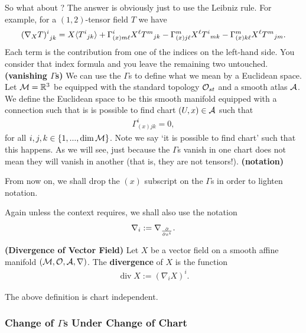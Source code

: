 \documentclass[12pt]{article} %
\newcommand{\bfs}[1]{\textbf{({#1}) }}
\begin{document}
So what about ? The answer is obviously just to use the Leibniz rule. For example, for a $(1,2)$-tensor field $T$ we have 
\begin{align*} 
    {(\nabla_XT)^i}_{jk} = X\langle {T^i}_{jk}\rangle + \Gamma^i_{(x)m\ell} X^{\ell} {T^m}_{jk} - \Gamma^m_{(x)j\ell}X^{\ell} {T^i}_{mk} - \Gamma^m_{(x)k\ell} X^{\ell}{T^m}_{jm}.
\end{align*} 
Each term is the contribution from one of the indices on the left-hand side. You consider that index formula and you leave the remaining two untouched. 
\br 
\label{rem:GammasChange}\bfs{vanishing $\Gamma$s}
    We can use the $\Gamma$s to define what we mean by a Euclidean space. Let $\mathcal{M}=\mathbb{R}^3$ be equipped with the standard topology $\mathcal{O}_{st}$ and a smooth atlas $\mathcal{A}$. We define the Euclidean space to be this smooth manifold equipped with a connection such that is is possible to find  chart $(U,x)\in\mathcal{A}$ such that 
    \begin{align*} 
        \Gamma^i_{(x)jk} = 0,
    \end{align*} 
    for all $i,j,k\in\{1,...,\dim\mathcal{M}\}$. Note we say `it is possible to find  chart' such that this happens. As we will see, just because the $\Gamma$s vanish in one chart does not mean they will vanish in another (that is, they are not tensors!).
\er 
\bnn\bfs{notation}
    \benr 
        \item From now on,  we shall drop the $(x)$ subscript on the $\Gamma$s in order to lighten notation.
        \item Again unless the context requires, we shall also use the notation 
        \begin{align*} 
            \nabla_i := \nabla_{\frac{\partial}{\partial x^i}}.
        \end{align*} 
    \een 
\enn 

\bd\bfs{Divergence of Vector Field}
    Let $X$ be a vector field on a smooth affine manifold $(\mathcal{M},\mathcal{O},\mathcal{A},\nabla)$. The \textbf{divergence} of $X$ is the function 
    \begin{align*} 
        \operatorname{div}X := (\nabla_i X)^i.
    \end{align*} 
\ed 

\bcl 
    The above definition is chart independent.
\ecl 

\subsubsection{Change of $\Gamma$s Under Change of Chart}\label{sec:iii}
\end{document}
